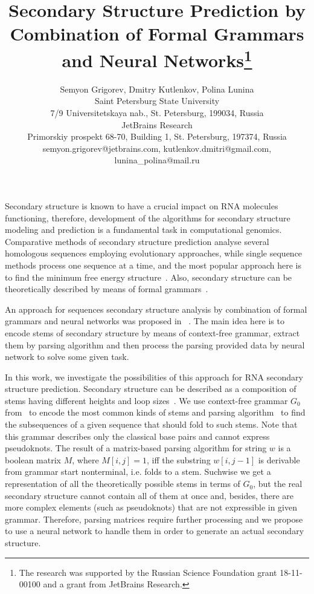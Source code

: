 \documentclass[12pt]{article}  %
\title{Secondary Structure Prediction by Combination of Formal Grammars and Neural Networks\footnote{The research was supported by the Russian Science Foundation grant 18-11-00100 and a grant from JetBrains Research.}}
\author{Semyon Grigorev, Dmitry Kutlenkov, Polina Lunina
\\ 
       \small{Saint Petersburg State University}\\
       \small{7/9 Universitetskaya nab., St. Petersburg, 199034, Russia}\\
       \small{JetBrains Research}\\
       \small{Primorskiy prospekt 68-70, Building 1, St. Petersburg, 197374, Russia} \\
       \small{semyon.grigorev@jetbrains.com, kutlenkov.dmitri@gmail.com, lunina\_polina@mail.ru}
       }
\date{}
\theoremstyle{definition}
\theoremstyle{remark}
\begin{document}
\maketitle
Secondary structure is known to have a crucial impact on RNA molecules functioning, therefore, development of the algorithms for secondary structure modeling and prediction is a fundamental task in computational genomics. Comparative methods of secondary structure prediction analyse several homologous sequences employing evolutionary approaches, while single sequence methods process one sequence at a time, and the most popular approach here is to find the minimum free energy structure~\cite{hofacker1994fast,hamada2009prediction}. Also, secondary structure can be theoretically described by means of formal \linebreak grammars~\cite{dowell2004evaluation,knudsen1999rna}.


An approach for sequences secondary structure analysis by combination of formal grammars and neural networks was proposed in ~\cite{grigorev2019composition,2019improved}. The main idea here is to encode stems of secondary structure by means of context-free grammar, extract them by parsing algorithm and then process the parsing provided data by neural network to solve some given task. 

In this work, we investigate the possibilities of this approach for RNA secondary structure prediction. Secondary structure can be described as a composition of stems having different heights and loop sizes~\cite{MQbioinformatics19}. We use context-free grammar $G_0$ from~\cite{grigorev2019composition,2019improved} to encode the most common kinds of stems and parsing algorithm~\cite{Azimov:2018:CPQ:3210259.3210264} to find the subsequences of a given sequence that should fold to such stems. Note that this grammar describes only the classical base pairs and cannot express pseudoknots. The result of a matrix-based parsing algorithm for string $w$ is a boolean matrix $M$, where $M[i,j] = 1$, iff the substring $w[i,j-1]$ is derivable from grammar start nonterminal, i.e. folds to a stem. Suchwise we get a representation of all the theoretically possible stems in terms of $G_0$, but the real secondary structure cannot contain all of them at once and, besides, there are more complex elements (such as pseudoknots) that are not expressible in given grammar. Therefore, parsing matrices require further processing and we propose to use a neural network to handle them in order to generate an actual secondary structure. 
\end{document}
